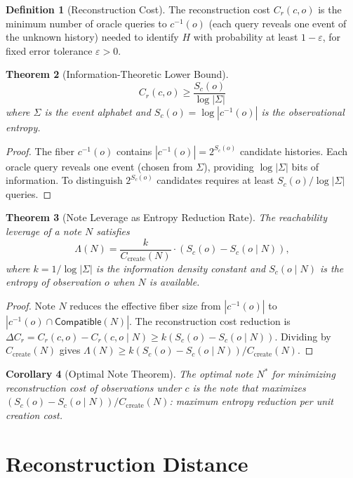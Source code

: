 \documentclass[12pt, a4paper, openany]{book}
\theoremstyle{plain}
\newtheorem{theorem}{Theorem}[chapter]
\newtheorem{corollary}[theorem]{Corollary}
\theoremstyle{definition}
\newtheorem{definition}[theorem]{Definition}
\theoremstyle{remark}
\begin{document}
\begin{definition}[Reconstruction Cost]
The reconstruction cost $C_r(c, o)$ is the minimum number of oracle queries
to $c^{-1}(o)$ (each query reveals one event of the unknown history) needed
to identify $H$ with probability at least $1 - \varepsilon$, for fixed
error tolerance $\varepsilon > 0$.
\end{definition}

\begin{theorem}[Information-Theoretic Lower Bound]
\[
C_r(c, o) \geq \frac{S_c(o)}{\log|\Sigma|}
\]
where $\Sigma$ is the event alphabet and $S_c(o) = \log|c^{-1}(o)|$ is the
observational entropy.
\end{theorem}

\begin{proof}
The fiber $c^{-1}(o)$ contains $|c^{-1}(o)| = 2^{S_c(o)}$ candidate histories.
Each oracle query reveals one event (chosen from $\Sigma$), providing
$\log|\Sigma|$ bits of information. To distinguish $2^{S_c(o)}$ candidates
requires at least $S_c(o) / \log|\Sigma|$ queries.
\end{proof}

\begin{theorem}[Note Leverage as Entropy Reduction Rate]
The reachability leverage of a note $N$ satisfies
\[
\Lambda(N) = \frac{k}{C_{\mathrm{create}}(N)} \cdot (S_c(o) - S_c(o \mid N)),
\]
where $k = 1/\log|\Sigma|$ is the information density constant and
$S_c(o \mid N)$ is the entropy of observation $o$ when $N$ is available.
\end{theorem}

\begin{proof}
Note $N$ reduces the effective fiber size from $|c^{-1}(o)|$ to $|c^{-1}(o) \cap
\mathsf{Compatible}(N)|$. The reconstruction cost reduction is
$\Delta C_r = C_r(c,o) - C_r(c,o \mid N) \geq k(S_c(o) - S_c(o \mid N))$.
Dividing by $C_{\mathrm{create}}(N)$ gives $\Lambda(N) \geq k(S_c(o) - S_c(o \mid N)) / C_{\mathrm{create}}(N)$.
\end{proof}

\begin{corollary}[Optimal Note Theorem]
The optimal note $N^*$ for minimizing reconstruction cost of observations under
$c$ is the note that maximizes $(S_c(o) - S_c(o \mid N)) / C_{\mathrm{create}}(N)$:
maximum entropy reduction per unit creation cost.
\end{corollary}

\section{Reconstruction Distance}
\end{document}

